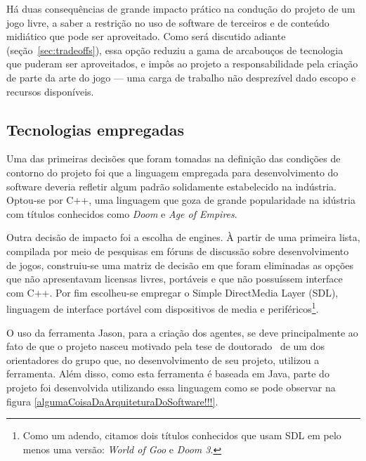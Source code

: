 Há duas consequências de grande impacto prático na condução do projeto de um jogo livre,  a saber a restrição no uso de software de terceiros e de conteúdo midiático que pode ser aproveitado. Como será discutido adiante (seção~\ref{sec:tradeoffs}), essa opção reduziu a gama de arcabouços de tecnologia que puderam ser aproveitados, e impôs ao projeto a responsabilidade pela criação de parte da arte do jogo --- uma carga de trabalho não desprezível dado escopo e recursos disponíveis.  

\subsection{Tecnologias empregadas}

Uma das primeiras decisões que foram tomadas na definição das condições de contorno do projeto foi que a linguagem empregada para desenvolvimento do software deveria refletir algum padrão solidamente estabelecido na indústria. Optou-se por C++, uma linguagem que goza de grande popularidade na idústria com títulos conhecidos como \emph{Doom} e \emph{Age of Empires}.

Outra decisão de impacto foi a escolha de engines. À partir de uma primeira lista, compilada por meio de pesquisas em fóruns de discussão sobre desenvolvimento de jogos, construiu-se uma matriz de decisão em que foram eliminadas as opções que não apresentavam licensas livres, portáveis e que não possuíssem interface com C++. Por fim escolheu-se empregar o Simple DirectMedia Layer (SDL), linguagem de interface portável com dispositivos de media e periféricos\footnote{Como um adendo, citamos dois títulos conhecidos que usam SDL em pelo menos uma versão: \emph{World of Goo} e \emph{Doom 3}.}.

O uso da ferramenta Jason, para a criação dos agentes, se deve principalmente ao fato de que o projeto nasceu motivado pela tese de doutorado~\cite{tese_roberto} de um dos orientadores do grupo que, no desenvolvimento de seu projeto, utilizou a ferramenta. Além disso, como esta ferramenta é baseada em Java, parte do projeto foi desenvolvida utilizando essa linguagem como se pode observar na figura \ref{algumaCoisaDaArquiteturaDoSoftware!!!}.



